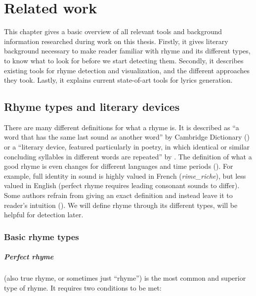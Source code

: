 \listofchanges
\chapter{Related work}\label{chap-related-work}
This chapter gives a basic overview of all relevant tools and background information researched during work on this thesis. Firstly, it gives literary background necessary to make  reader familiar with rhyme and its different types, to know what to look for before we start detecting them. Secondly, it describes existing tools for rhyme detection and visualization, and the different approaches they took. Lastly, it explains current state-of-art tools for lyrics generation.


\section{Rhyme types and literary devices}

There are many different definitions for what a rhyme is. It is described as ``a word that has the same last sound as another word'' by Cambridge Dictionary (\cite{walter2008cambridge}) or a ``literary device, featured particularly in poetry, in which identical or similar concluding syllables in different words are repeated'' by \cite{literarydevices2020}. The definition of what a good rhyme is even changes for different languages and time periods (\cite{zhirmunsky2013introduction}). For example, full identity in sound is highly valued in French (\textit{\gls{rime_riche}}), but less valued in English (perfect rhyme requires leading consonant sounds to differ). Some authors refrain from giving an exact definition and instead leave it to reader's intuition (\cite{plechavc2018collocation}). We will define rhyme through its different types,  will be helpful for detection later.

\subsection{Basic rhyme types}
\paragraph{Perfect rhyme} (also true rhyme, or sometimes just ``rhyme'') is the most common and superior type of rhyme. It requires two conditions to be met:

